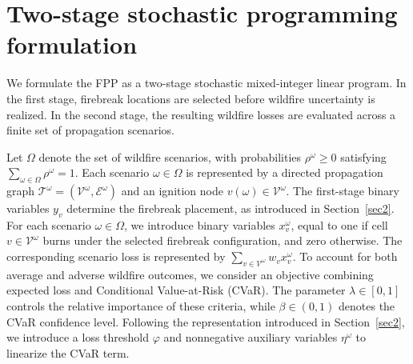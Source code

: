 \documentclass[a4paper,fleqn]{cas-sc}
\begin{document}


\section{Two-stage stochastic programming formulation}
\label{s:general-model}

We formulate the FPP as a two-stage stochastic mixed-integer
linear program. In the first stage, firebreak locations are
selected before wildfire uncertainty is realized. In the
second stage, the resulting wildfire losses are evaluated
across a finite set of propagation scenarios.

Let $\Omega$ denote the set of wildfire scenarios, with
probabilities $\rho^\omega \geq 0$ satisfying
$\sum_{\omega\in\Omega}\rho^\omega=1$.
Each scenario $\omega\in\Omega$ is represented by a
directed propagation graph
$\mathcal{T}^\omega=(\mathcal{V}^\omega,
\mathcal{E}^\omega)$ and an ignition node
$v(\omega)\in\mathcal{V}^\omega$. The first-stage binary variables $y_v$ determine the
firebreak placement, as introduced in
Section~\ref{sec2}. For each scenario $\omega\in\Omega$,
we introduce binary variables $x_v^\omega$, equal to
one if cell $v\in\mathcal{V}^\omega$ burns under the
selected firebreak configuration, and zero otherwise.
The corresponding scenario loss is represented by
$\sum_{v\in\mathcal{V}^\omega}w_vx_v^\omega$. To account for both average and adverse wildfire outcomes,
we consider an objective combining expected loss and
Conditional Value-at-Risk (CVaR). The parameter
$\lambda\in[0,1]$ controls the relative importance
of these criteria, while $\beta\in(0,1)$ denotes
the CVaR confidence level. Following the representation
introduced in Section~\ref{sec2}, we introduce a loss
threshold $\varphi$ and nonnegative auxiliary variables
$\eta^\omega$ to linearize the CVaR term.
\end{document}
